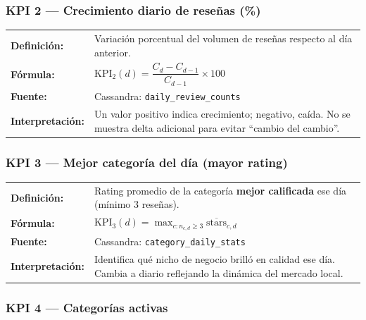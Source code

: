 \documentclass[12pt,a4paper]{article}
\begin{document}
\vspace{0.5em}

\subsubsection{KPI 2 — Crecimiento diario de reseñas (\%)}

\begin{tabular}{>{\bfseries}l >{\raggedright\arraybackslash}p{10.5cm}}
\textbf{Definición:} & Variación porcentual del volumen de reseñas respecto al día anterior. \\
\textbf{Fórmula:} & $\text{KPI}_2(d) = \dfrac{C_d - C_{d-1}}{C_{d-1}} \times 100$ \\
\textbf{Fuente:} & Cassandra: \texttt{daily\_review\_counts} \\
\textbf{Interpretación:} & Un valor positivo indica crecimiento; negativo, caída. No se muestra delta adicional para evitar ``cambio del cambio''. \\
\end{tabular}

\vspace{0.5em}

\subsubsection{KPI 3 — Mejor categoría del día (mayor rating)}

\begin{tabular}{>{\bfseries}l >{\raggedright\arraybackslash}p{10.5cm}}
\textbf{Definición:} & Rating promedio de la categoría \textbf{mejor calificada} ese día (mínimo 3 reseñas). \\
\textbf{Fórmula:} & $\text{KPI}_3(d) = \max_{c : n_{c,d} \geq 3} \overline{\text{stars}}_{c,d}$ \\
\textbf{Fuente:} & Cassandra: \texttt{category\_daily\_stats} \\
\textbf{Interpretación:} & Identifica qué nicho de negocio brilló en calidad ese día. Cambia a diario reflejando la dinámica del mercado local. \\
\end{tabular}

\vspace{0.5em}

\subsubsection{KPI 4 — Categorías activas}
\end{document}
